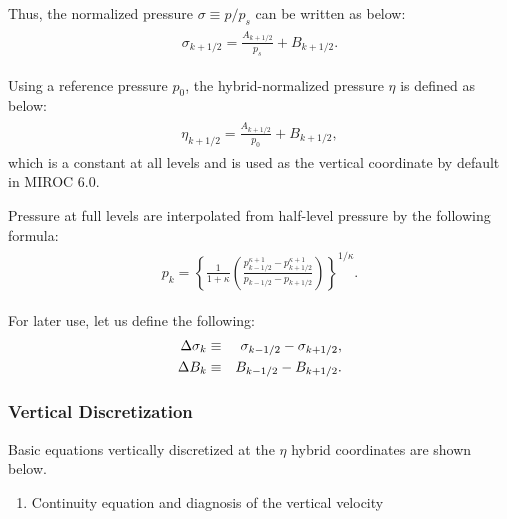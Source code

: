Thus, the normalized pressure \(\sigma\equiv p/p_s\) can be written as below: \begin{eqnarray}\begin{aligned}
\sigma_{k+1/2} = \frac{A_{k+1/2}}{p_s} +B_{k+1/2}.\end{aligned}\end{eqnarray}

Using a reference pressure \(p_0\), the hybrid-normalized pressure \(\eta\) is defined as below: \begin{eqnarray}\begin{aligned}
\eta_{k+1/2} = \frac{A_{k+1/2}}{p_0} +B_{k+1/2},\end{aligned}\end{eqnarray} which is a constant at all levels and is used as the vertical coordinate by default in MIROC 6.0.

Pressure at full levels are interpolated from half-level pressure by the following formula: \begin{eqnarray}\begin{aligned}
 p_k = \left\{ \frac{1}{1+\kappa}
                     \left( \frac{  p^{\kappa +1}_{k-1/2}
                                  - p^{\kappa +1}_{k+1/2}      }
                                  { p_{k-1/2} - p_{k+1/2} }
                     \right)
              \right\}^{1/\kappa}.\end{aligned}\end{eqnarray}

For later use, let us define the following: \begin{eqnarray}\begin{aligned}
  \Delta\sigma_k &\equiv & \sigma_{k-1/2} - \sigma_{k+1/2}, \notag\\
  \Delta B_k &\equiv & B_{k-1/2} - B_{k+1/2}.\end{aligned}\end{eqnarray}

\hypertarget{vertical-discretization-1}{%
\subsubsection{Vertical Discretization}\label{vertical-discretization-1}}

Basic equations vertically discretized at the \(\eta\) hybrid coordinates are shown below.

\begin{enumerate}
\def\labelenumi{\arabic{enumi}.}
\tightlist
\item
  Continuity equation and diagnosis of the vertical velocity
\end{enumerate}

